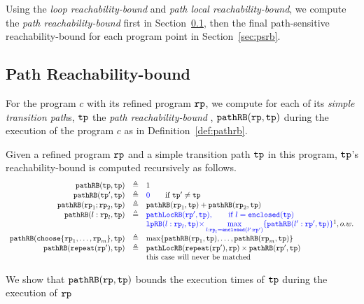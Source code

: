 Using the \emph{loop reachability-bound} and \emph{path local reachability-bound}, we compute the \emph{path reachability-bound} first in Section~\ref{sec:pathrb}, 
then the final path-sensitive reachability-bound for each program point in Section~\ref{sec:psrb}.
\subsection{Path Reachability-bound}
\label{sec:pathrb}
For the program $c$ with its refined program $\mathtt{rp}$, we compute
for each of its \emph{simple transition path}s, $\mathtt{tp}$ the \emph{path reachability-bound} , $\mathtt{pathRB}(\mathtt{rp}, \mathtt{tp})$ during the execution of the program $c$ as in Definition~\ref{def:pathrb}.
%
\begin{defn}
  \label{def:pathrb}
  Given a refined program $\mathtt{rp}$ and a simple transition path $\mathtt{tp}$ in this program, 
  $\mathtt{tp}$'s reachability-bound
  is computed recursively as follows. 
\[
  \begin{array}{rcl}
    \inoutB(\tpath, \tpath) & \triangleq & 1  \\
    \inoutB(\tpath', \tpath) & \triangleq & \highlight{0} \qquad \text{if } \tpath' \neq \tpath\\
    \inoutB(\rprog_1;\rprog_2, \tpath) & \triangleq & \inoutB(\rprog_1, \tpath) + \inoutB(\rprog_2, \tpath) \\
    \inoutB(l: \rprog_l, \tpath) & \triangleq & 
    \highlight{\outinB(\rprog', \tpath), \qquad \text{if } l = \kw{enclosed}(\tpath)}
    \\
    &  & 
    \highlight{
      \lpchB(l:\rprog_l, \tpath ) }
    \highlight{\times \max\limits_{l:\rprog_l = \kw{enclosed}(l':\rprog')}
   \{\inoutB(l':\rprog', \tpath)\} } \footnotemark, o.w. \\
    \inoutB(\rpchoose{\rprog_1, \ldots, \rprog_m }, \tpath) & \triangleq 
    & \max\left\{ \inoutB(\rprog_1, \tpath), \ldots, \inoutB(\rprog_m, \tpath) \right\} 
    \\
    \inoutB(\rprepeat(\rprog'), \tpath) & \triangleq & \outinB(\rprepeat(\rprog'), \rprog) \times \inoutB(\rprog', \tpath)\\
    &  & \text{this case will never be matched}
    \end{array}
  \]
  \end{defn}
%
We show that $\mathtt{pathRB}(\mathtt{rp}, \mathtt{tp})$ bounds the execution times of $\mathtt{tp}$ during the execution of $\mathtt{rp}$

